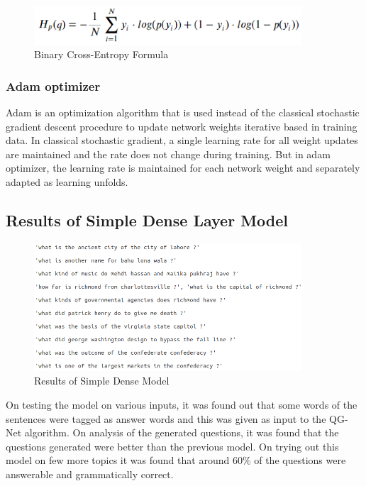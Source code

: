 \begin{figure}
	\caption{Binary Cross-Entropy Formula}
	\centering\includegraphics[width=10cm]{8.png}
\end{figure}

\subsubsection{Adam optimizer}
Adam is an optimization algorithm that is used instead of the classical
stochastic gradient descent procedure to update network weights iterative based
in training data. In classical stochastic gradient, a single learning rate for
all weight updates are maintained and the rate does not change during training.
But in adam optimizer, the learning rate is maintained for each network weight
and separately adapted as learning unfolds.


\subsection{Results of Simple Dense Layer Model}

\begin{figure}[b]
	\caption{Results of Simple Dense Model}
	\centering\includegraphics[width=10cm]{12.png}
\end{figure}

On testing the model on various inputs, it was found out that some words of the
sentences were tagged as answer words and this was given as input to the QG-Net
algorithm. On analysis of the generated questions, it was found that the
questions generated were better than the previous model. On trying out this
model on few more topics it was found that around 60\% of the questions were
answerable and grammatically correct.
